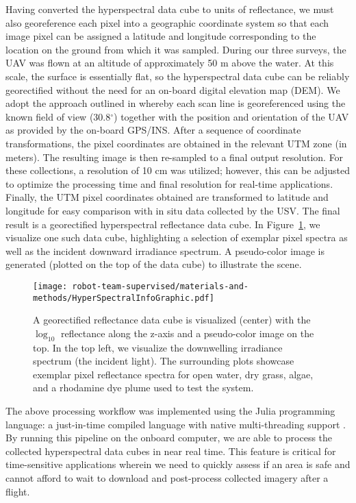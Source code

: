 Having converted the hyperspectral data cube to units of reflectance, we must also georeference each pixel into a geographic coordinate system so that each image pixel can be assigned a latitude and longitude corresponding to the location on the ground from which it was sampled. During our three surveys, the UAV was flown at an altitude of approximately %
50 m above the water. At this scale, the surface is essentially flat, so the hyperspectral data cube can be reliably georectified without the need for an on-board digital elevation map (DEM). We adopt the approach outlined in \cite{muller2002program, baumker2001new, mostafa2000multi} whereby each scan line is georeferenced using the known field of view (30.8$^\circ$) together with the position and orientation of the UAV as provided by the on-board GPS/INS. After a sequence of coordinate transformations, the pixel coordinates are obtained in the relevant UTM zone (in meters). The resulting image is then re-sampled to a final output resolution. For these collections, a resolution of 10 cm was utilized; however, this can be adjusted to optimize the processing time and final resolution for real-time applications. Finally, the UTM pixel coordinates obtained are transformed to latitude and longitude for easy comparison with in situ data collected by the USV. The final result is a georectified hyperspectral reflectance data cube. In Figure~\ref{fig:hsi-infographic}, we visualize one such data cube, highlighting a selection of exemplar pixel spectra as well as the incident downward irradiance spectrum. A pseudo-color image is generated (plotted on the top of the data cube) to illustrate the scene.

\begin{figure}[H]
  \centering
  \texttt{[image: robot-team-supervised/materials-and-methods/HyperSpectralInfoGraphic.pdf]}
  \caption{A georectified reflectance data cube is visualized (center) with the
    $\log_{10}$ reflectance along the z-axis and a pseudo-color image on the
    top. In the top left, we visualize the downwelling irradiance spectrum (the
    incident light). The surrounding plots showcase exemplar pixel reflectance
    spectra for open water, dry grass, algae, and a rhodamine dye plume used to
    test the system.\label{fig:hsi-infographic}}
\end{figure}  

The above processing workflow was implemented using the Julia programming language: a just-in-time compiled language with native multi-threading support \cite{bezanson2012julia}. By running this pipeline on the onboard computer, we are able to process the collected hyperspectral data cubes in near real time. This feature is critical for time-sensitive applications wherein we need to quickly assess if an area is safe and cannot afford to wait to download and post-process collected imagery after a flight.

